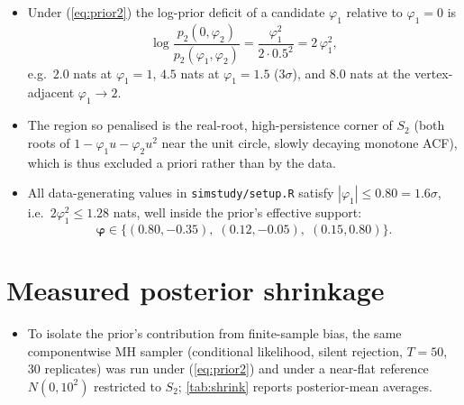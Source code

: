 \documentclass[11pt]{article}
\newcommand{\eref}[1]{(\ref{#1})}
\newcommand{\bphi}{\boldsymbol{\varphi}}
\theoremstyle{plain}
\theoremstyle{definition}
\theoremstyle{remark}
\begin{document}
\begin{itemize}
  \item Under \eref{eq:prior2} the log-prior deficit of a candidate
        $\varphi_1$ relative to $\varphi_1 = 0$ is
        \begin{equation}\label{eq:penalty}
          \log \frac{p_2(0, \varphi_2)}{p_2(\varphi_1, \varphi_2)}
          = \frac{\varphi_1^2}{2 \cdot 0.5^2}
          = 2\, \varphi_1^2,
        \end{equation}
        e.g.\ $2.0$ nats at $\varphi_1 = 1$, $4.5$ nats at $\varphi_1 = 1.5$
        ($3\sigma$), and $8.0$ nats at the vertex-adjacent $\varphi_1 \to 2$.
  \item The region so penalised is the real-root, high-persistence corner of
        $S_2$ (both roots of $1 - \varphi_1 u - \varphi_2 u^2$ near the unit
        circle, slowly decaying monotone ACF), which is thus excluded a
        priori rather than by the data.
  \item All data-generating values in \texttt{simstudy/setup.R} satisfy
        $|\varphi_1| \leq 0.80 = 1.6\sigma$, i.e.\
        $2 \varphi_1^2 \leq 1.28$ nats, well inside the prior's effective
        support:
        \begin{equation}\label{eq:dgps}
          \bphi \in \bigl\{ (0.80, -0.35),\; (0.12, -0.05),\;
                            (0.15, 0.80) \bigr\}.
        \end{equation}
\end{itemize}

\section{Measured posterior shrinkage}\label{sec:shrinkage}

\begin{itemize}
  \item To isolate the prior's contribution from finite-sample bias, the same
        componentwise MH sampler (conditional likelihood, silent rejection,
        $T = 50$, $30$ replicates) was run under \eref{eq:prior2} and under a
        near-flat reference $N(0, 10^2)$ restricted to $S_2$;
        \cref{tab:shrink} reports posterior-mean averages.
\end{itemize}
\end{document}
